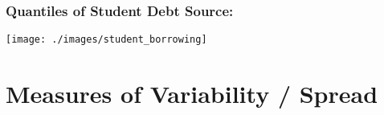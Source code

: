 %
%
%
\begin{frame}
  \frametitle{Quantiles of Student Debt \hfill \footnotesize Source: \href{http://www.aeaweb.org/articles.php?doi=10.1257/jep.26.1.165}{}}


\centering \texttt{[image: ./images/student\_borrowing]}


\end{frame}


\section{Measures of Variability / Spread}

